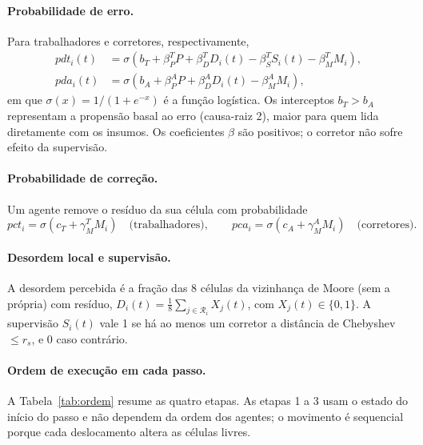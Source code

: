 \documentclass[11pt, a4paper]{article}
\begin{document}
\paragraph{Probabilidade de erro.}
Para trabalhadores e corretores, respectivamente,
\begin{align*}
pdt_i(t)&=\sigma\!\left(b_T+\beta_P^T P+\beta_D^T D_i(t)-\beta_S^T S_i(t)-\beta_M^T M_i\right),\\
pda_i(t)&=\sigma\!\left(b_A+\beta_P^A P+\beta_D^A D_i(t)-\beta_M^A M_i\right),
\end{align*}
em que $\sigma(x)=1/(1+e^{-x})$ é a função logística. Os interceptos $b_T>b_A$ representam a propensão basal ao erro (causa-raiz 2), maior para quem lida diretamente com os insumos. Os coeficientes $\beta$ são positivos; o corretor não sofre efeito da supervisão.

\paragraph{Probabilidade de correção.}
Um agente remove o resíduo da sua célula com probabilidade
\[
pct_i=\sigma\!\left(c_T+\gamma_M^T M_i\right)
\quad\text{(trabalhadores)},
\qquad
pca_i=\sigma\!\left(c_A+\gamma_M^A M_i\right)
\quad\text{(corretores)}.
\]

\paragraph{Desordem local e supervisão.}
A desordem percebida é a fração das 8 células da vizinhança de Moore (sem a própria) com resíduo, $D_i(t)=\frac{1}{8}\sum_{j\in\mathcal{R}_i}X_j(t)$, com $X_j(t)\in\{0,1\}$. A supervisão $S_i(t)$ vale 1 se há ao menos um corretor a distância de Chebyshev $\le r_s$, e 0 caso contrário.

\paragraph{Ordem de execução em cada passo.}
A Tabela~\ref{tab:ordem} resume as quatro etapas. As etapas 1 a 3 usam o estado do início do passo e não dependem da ordem dos agentes; o movimento é sequencial porque cada deslocamento altera as células livres.
\end{document}
